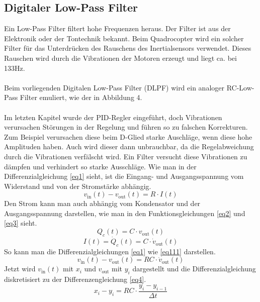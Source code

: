 \documentclass[12pt,a4paper, ngerman]{article}
\begin{document}
\subsection{Digitaler Low-Pass Filter}
Ein Low-Pass Filter filtert hohe Frequenzen heraus. Der Filter ist aus der Elektronik oder der Tontechnik bekannt. Beim Quadrocopter wird ein solcher Filter für das Unterdrücken des Rauschens des Inertialsensors verwendet. Dieses Rauschen wird durch die Vibrationen der Motoren erzeugt und liegt ca. bei 133Hz.\\ \\
Beim vorliegenden Digitalen Low-Pass Filter (DLPF) wird ein analoger RC-Low-Pass Filter emuliert\cite{website:Wikipedia_LPF}, wie der in Abbildung 4.\\ \\
Im letzten Kapitel wurde der PID-Regler eingeführt, doch Vibrationen verursachen Störungen in der Regelung und führen so zu falschen Korrekturen. Zum Beispiel verursachen diese beim D-Glied starke Auschläge, wenn diese hohe Amplituden haben\cite{website:rn-wissen_Regelungstechnik}. Auch wird dieser dann unbrauchbar, da die Regelabweichung durch die Vibrationen verfälscht wird. Ein Filter versucht diese Vibrationen zu dämpfen und verhindert so starke Ausschläge.
Wie man in der Differenzialgleichung \ref{eq1} sieht, ist die Eingang- und Ausgangsspannung vom Widerstand und von der Stromstärke abhängig.
\begin{equation} \label{eq1}
v_{\text{in}}(t)-v_{\text{out}}(t)=R\cdot I(t)
\end{equation}
Den Strom kann man auch abhängig vom Kondensator und der Ausgangsspannung darstellen, wie man in den Funktionsgleichungen  \ref{eq2} und \ref{eq3} sieht.
\begin{equation} \label{eq2}
Q_{c}(t)=C\cdot v_{\text{out}}(t)
\end{equation}
\begin{equation} \label{eq3}
I(t)=\dot{Q}_{c}(t)=C\cdot \dot{v}_{\text{out}}(t)
\end{equation}
So kann man die Differenzialgleichungen \ref{eq1} wie \ref{eq111} darstellen.\\
\begin{equation} \label{eq111}
v_{\text{in}}(t)-v_{\text{out}}(t)=RC\cdot \dot{v}_{\text{out}}(t)
\end{equation}
Jetzt wird $v_{\text{in}}(t)$ mit $x_{i}$ und $v_{\text{out}}$ mit $y_{i}$ dargestellt und die Differenzialgleichung diskretisiert zu der Differenzengleichung \ref{eq4}.
\begin{equation}\label{eq4}
x_{i}-y_{i}=RC\cdot \frac{y_{i}-y_{i-1}}{\Delta t}
\end{equation}
\end{document}
